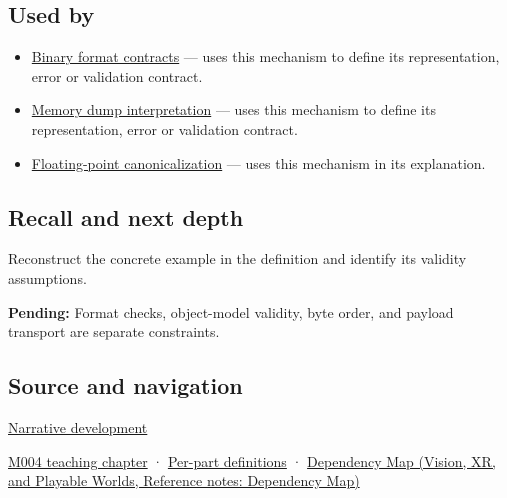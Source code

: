 \subsection{Used by}\label{appendix-34ee45f161c1-used-by}

\begin{itemize}
\item
  \hyperref[appendix-590bbb2424c1]{Binary format contracts} --- uses this mechanism to define its representation, error or validation contract.
\item
  \hyperref[appendix-230b59c0676b]{Memory dump interpretation} --- uses this mechanism to define its representation, error or validation contract.
\item
  \hyperref[appendix-e90053a4b201]{Floating-point canonicalization} --- uses this mechanism in its explanation.
\end{itemize}

\subsection{Recall and next depth}\label{appendix-34ee45f161c1-recall-and-next-depth}

Reconstruct the concrete example in the definition and identify its validity assumptions.

\textbf{Pending:} Format checks, object-model validity, byte order, and payload transport are separate constraints.

\subsection{Source and navigation}\label{appendix-34ee45f161c1-source-and-navigation}

\hyperref[01-foundations-i-ch002-bytes-become-a-durable-agreement]{Narrative development}

\hyperref[01-foundations-i-ch001-a-stretching-ruler-for-real-valued-quantities]{M004 teaching chapter} · \hyperref[appendix-fd090d982a15-m004---parts-61-76]{Per-part definitions} · \href{../07-Vision-XR-and-Playable-Worlds/main.pdf\#nameddest=appendix-4ad47bdd269a}{Dependency Map (Vision, XR, and Playable Worlds, Reference notes: Dependency Map)}
